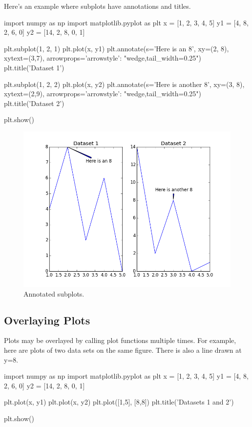 \documentclass[11pt]{cselabheader}
\begin{document}
Here's an example where subplots have annotations and titles.

\begin{python3code}
import numpy as np
import matplotlib.pyplot as plt
x = [1, 2, 3, 4, 5]
y1 = [4, 8, 2, 6, 0]
y2 = [14, 2, 8, 0, 1]

plt.subplot(1, 2, 1)
plt.plot(x, y1)
plt.annotate(s='Here is an 8', xy=(2, 8), xytext=(3,7),
             arrowprops={'arrowstyle': "wedge,tail_width=0.25"})
plt.title('Dataset 1')

plt.subplot(1, 2, 2)
plt.plot(x, y2)
plt.annotate(s='Here is another 8', xy=(3, 8), xytext=(2,9),
             arrowprops={'arrowstyle': "wedge,tail_width=0.25"})
plt.title('Dataset 2')

plt.show()
\end{python3code}

\begin{figure}[H]
  \centering
  \includegraphics[width=\textwidth]{img/matplotlib_labeledsubplot.png}
  \caption{Annotated subplots.}
\end{figure}

\subsection{Overlaying Plots}
Plots may be overlayed by calling plot functions multiple times.
For example, here are plots of two data sets on the same figure.
There is also a line drawn at y=8.

\begin{python3code}
import numpy as np
import matplotlib.pyplot as plt
x = [1, 2, 3, 4, 5]
y1 = [4, 8, 2, 6, 0]
y2 = [14, 2, 8, 0, 1]

plt.plot(x, y1)
plt.plot(x, y2)
plt.plot([1,5], [8,8])
plt.title('Datasets 1 and 2')

plt.show()
\end{python3code}
\end{document}
